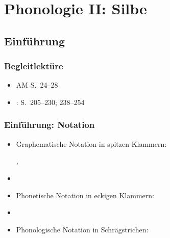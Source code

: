 \nocite{Altmann&Co07a}
\nocite{DudenAussprache00a}
\nocite{Hall00a} 
\nocite{Kohler99a}
\nocite{Krech&Co09a}
\nocite{Pompino95a}
\nocite{Ramers08a}
\nocite{Ramers&Vater92a}
\nocite{Rues&Co07a}
\nocite{WieseR96a}
\nocite{WieseR11a}


\section{Phonologie II: Silbe}


\subsection{Einführung}

\begin{frame}
\frametitle{Begleitlektüre}
\begin{itemize}
	\item AM S.~24--28
	\item \citet[Kapitel~8]{Hall00a}:  S.~205--230; 238--254
\end{itemize}
\end{frame}


\begin{frame}
\frametitle{Einführung: Notation}


\begin{itemize}
	\item Graphematische Notation in spitzen Klammern: 
	
	  \ea
          , 
          \z
          
	\item[]	
	\item Phonetische Notation in eckigen Klammern:
	
	  \ea
          \textipa{[nO5t.vInt]}
	  \z
          
	\item[]
	\item Phonologische Notation in Schrägstrichen:
	
	  \ea
	  \z
\end{itemize}

\end{frame}



